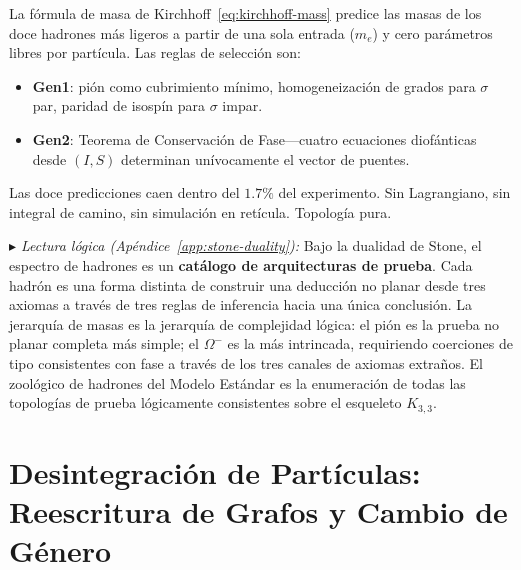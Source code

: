 \documentclass[11pt, a4paper, openany]{book}
\newcommand{\stoneref}[1]{%
  \smallskip\noindent
  {\small\color{structure!70}\textit{$\blacktriangleright$ Lectura
  l\'ogica (Ap\'endice~\ref{app:stone-duality}):} #1}%
  \smallskip}
\begin{document}
\begin{result}[title={Doce masas de hadrones desde aritm\'etica de enteros}]
\label{res:hadron-spectrum}
La f\'ormula de masa de Kirchhoff~\eqref{eq:kirchhoff-mass} predice
las masas de los doce hadrones m\'as ligeros a partir de una sola
entrada ($m_e$) y cero par\'ametros libres por part\'icula.  Las
reglas de selecci\'on son:
\begin{itemize}
  \item \textbf{Gen1}: pi\'on como cubrimiento m\'inimo,
    homogeneizaci\'on de grados para $\sigma$ par, paridad de
    isosp\'in para $\sigma$ impar.
  \item \textbf{Gen2}: Teorema de Conservaci\'on de
    Fase---cuatro ecuaciones diof\'anticas desde $(I, S)$
    determinan un\'ivocamente el vector de puentes.
\end{itemize}
Las doce predicciones caen dentro del $1{.}7\%$ del experimento.
Sin Lagrangiano, sin integral de camino, sin simulaci\'on en
ret\'icula.  Topolog\'ia pura.
\end{result}

\stoneref{Bajo la dualidad de Stone, el espectro de hadrones es un
\textbf{cat\'alogo de arquitecturas de prueba}.  Cada hadr\'on es
una forma distinta de construir una deducci\'on no planar desde tres
axiomas a trav\'es de tres reglas de inferencia hacia una \'unica
conclusi\'on.  La jerarqu\'ia de masas es la jerarqu\'ia de
complejidad l\'ogica: el pi\'on es la prueba no planar completa
m\'as simple; el $\Omega^-$ es la m\'as intrincada, requiriendo
coerciones de tipo consistentes con fase a trav\'es de los tres
canales de axiomas extra\~nos.  El zool\'ogico de hadrones del
Modelo Est\'andar es la enumeraci\'on de todas las topolog\'ias de
prueba l\'ogicamente consistentes sobre el esqueleto $K_{3,3}$.}



\chapter{Desintegración de Partículas: Reescritura de Grafos y Cambio de Género}
\label{ch:decay}
\end{document}
